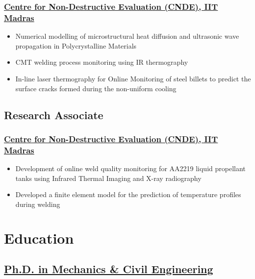 \documentclass{my_cv}%
\begin{document}
\subsubsection{\href{https://www.cnde.in/}{Centre for Non-Destructive Evaluation (CNDE), IIT Madras}}
\begin{itemize}[leftmargin=0.15in]
\setlength\itemsep{-0.1em}
\color{mygray}
\item Numerical modelling of microstructural heat diffusion and ultrasonic wave propagation in Polycrystalline Materials
\item CMT welding process monitoring using IR thermography 
\item In-line laser thermography for Online Monitoring of steel billets to predict the surface cracks formed during the non-uniform cooling
\end{itemize}
{\color{mygray1} \hdashrule[0.1ex]{18.8cm}{0.2mm}{1mm}}
\subsection{Research Associate}
\subsubsection{\href{https://www.cnde.in/}{Centre for Non-Destructive Evaluation (CNDE), IIT Madras}}
\begin{itemize}[leftmargin=0.15in]
\setlength\itemsep{-0.1em}
\color{mygray}
\item Development of online weld quality monitoring for AA2219 liquid propellant tanks using Infrared Thermal Imaging and X-ray radiography
\item Developed a finite element model for the prediction of temperature profiles during welding
\end{itemize}
\section{Education}
\vspace{2em}
\subsection{\href{https://adum.fr/as/ed/cv.pl?mat=39446&site=adumR} {Ph.D. in Mechanics \& Civil Engineering}}
\end{document}

